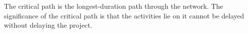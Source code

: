 \documentclass[article, 10pt,onecolumn]{article}
\begin{document}
The critical path is the longest-duration path through the network. The significance of the critical path is that the activities lie on it cannot be delayed without delaying the project.

%


\end{document}
